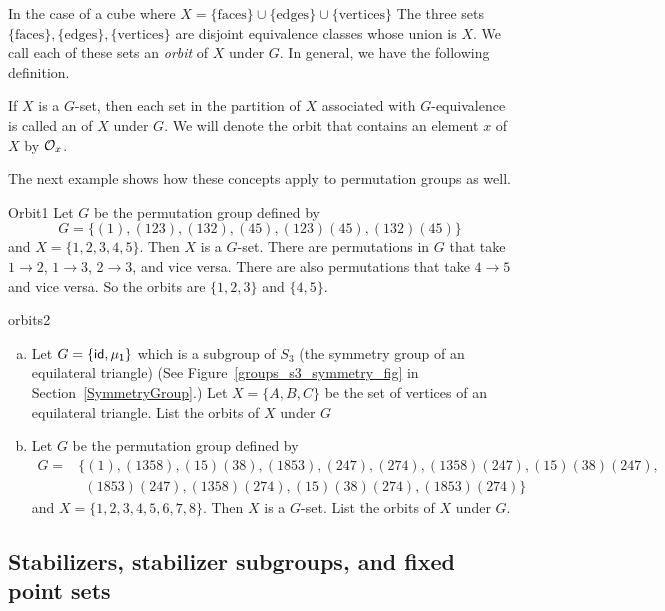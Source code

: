 In the case of a cube where $X=\{\text{faces}\}\cup\{\text{edges}\}\cup\{\text{vertices}\}$ The three sets $\{\text{faces}\},\{\text{edges}\},\{\text{vertices}\}$ are disjoint equivalence classes whose union is $X$. We call each of these sets an \emph{orbit} of $X$ under $G$.  In general, we have the following definition.

\begin{defn} \label{noteorbit}
If $X$ is a $G$-set, then each set in the partition of $X$ associated with
$G$-equivalence is called an  of $X$ under $G$. We will denote the orbit that contains an element $x$ of $X$ by
${\cal O}_x$. 
\end {defn}
The next example shows how these concepts apply to permutation groups as well.

\begin{example}{Orbit1}
Let $G$ be the permutation group defined by
\[
G =\{(1), (1 23), (1 3 2), (4 5), (1 2 3)(4 5), (1 3 2)(4 5) \}
\]
and $X = \{ 1, 2, 3, 4, 5\}$. Then $X$ is a $G$-set. There are permutations in $G$ that take $1\rightarrow2$, $1\rightarrow3$, $2\rightarrow3$, and vice versa. There are also permutations that take $4\rightarrow 5$ and vice versa.  So the orbits are $\{1, 2, 3\}$ and $\{4, 5\}$. 
\end{example} 
 
\begin{exercise}{orbits2}
\begin{enumerate}[(a)]
\item Let $G=\{\sf{id},\mu_1\}$ which is a subgroup of $S_3$ (the symmetry group of an equilateral triangle) (See Figure~\ref{groups_s3_symmetry_fig} in Section~\ref{SymmetryGroup}.) Let $X=\{A,B,C\}$ be the set of vertices of an equilateral triangle. List the orbits of $X$ under $G$
\item Let $G$ be the permutation group defined by
\begin{align*}
G =&\{(1), (1358),(15)(38), (1853), (247),(274), (1358)(247),(15)(38)(247),\\
&~~ (1853)(247),(1358)(274),(15)(38)(274),(1853)(274) \}
\end{align*}
and $X = \{ 1, 2, 3, 4, 5,6,7,8\}$. Then $X$ is a $G$-set.  List the orbits of $X$ under $G$.
\end{enumerate}
\end {exercise}


\subsection{Stabilizers, stabilizer subgroups, and fixed point sets}

